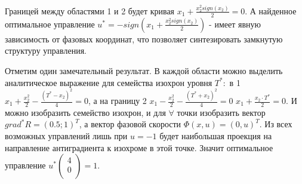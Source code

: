 \documentclass[preprint,russian,a5paper,10pt,twoside,mediummath]{ncc}
\begin{document}
\par Границей между областями 1 и 2 будет кривая ${{x}_{1}}+\frac{x_{2}^{2}sign\left( {{x}_{2}} \right)}{2}=0$. А найденное оптимальное управление ${{u}^{*}}=-sign\left( {{x}_{1}}+\frac{x_{2}^{2}sign\left( {{x}_{2}} \right)}{2} \right)$ - имеет явную зависимость от фазовых координат, что позволяет синтезировать замкнутую структуру управления.
\par Отметим один замечательный результат. В каждой области можно выделить аналитическое выражение для  семейства изохрон уровня ${{T}^{*}}:$ в 1 ${{x}_{1}}+\frac{x_{2}^{2}}{2}-\frac{{{\left( {{T}^{*}}-{{x}_{2}} \right)}^{2}}}{4}=0$, а на границу 2 ${{x}_{1}}-\frac{x_{2}^{2}}{2}-\frac{{{\left( {{T}^{*}}+{{x}_{2}} \right)}^{2}}}{4}=0$ ${{x}_{1}}+\frac{{{x}_{2}}\cdot {{T}^{*}}}{2}=0$. И можно изобразить семейство изохрон, и для $\forall $ точки изобразить вектор $gra{{d}^{*}}R={{\left( 0.5;1 \right)}^{T}}$, а вектор фазовой скорости $\Phi \left( x,u \right)={{\left( 0,u \right)}^{T}}$. Из всех возможных управлений лишь при $u=-1$ будет наибольшая проекция на направление антиградиента к изохроме в этой точке. Значит оптимальное управление ${{u}^{*}}\left( \begin{array}{*{35}{l}}
   4  \\
   0  \\
\end{array} \right)=1$.
\end{document}
